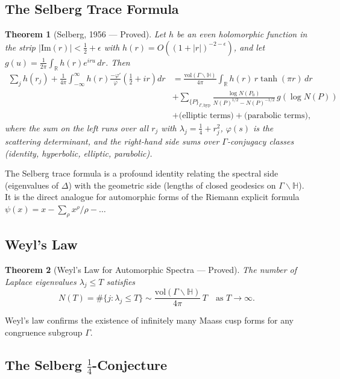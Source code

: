 \documentclass[12pt,a4paper]{amsart}
\newtheorem{theorem}{Theorem}[section]
\theoremstyle{definition}
\newcommand{\HH}{\mathbb{H}}
\newcommand{\RR}{\mathbb{R}}
\newcommand{\im}{\mathrm{Im}}
\newcommand{\vol}{\mathrm{vol}}
\begin{document}
\subsection{The Selberg Trace Formula}

\begin{theorem}[Selberg, 1956 — Proved]
\label{thm:selberg_trace}
Let $h$ be an even holomorphic function in the strip $|\im(r)| < \frac{1}{2}+\epsilon$
with $h(r) = O((1+|r|)^{-2-\epsilon})$, and let $g(u) = \frac{1}{2\pi} \int_\RR h(r) e^{iru}\, dr$.
Then
\begin{align*}
\sum_j h(r_j) + \frac{1}{4\pi}\int_{-\infty}^\infty h(r) \frac{-\varphi'}{\varphi}\!\left(\tfrac{1}{2}+ir\right) dr
&= \frac{\vol(\Gamma \backslash \HH)}{4\pi}\int_\RR h(r)\, r \tanh(\pi r)\, dr \\
&+ \sum_{\{P\}_{\Gamma,\text{hyp}}} \frac{\log N(P_0)}{N(P)^{1/2} - N(P)^{-1/2}}\, g(\log N(P)) \\
&+ \text{(elliptic terms)} + \text{(parabolic terms)},
\end{align*}
where the sum on the left runs over all $r_j$ with $\lambda_j = \frac{1}{4}+r_j^2$,
$\varphi(s)$ is the scattering determinant, and the right-hand side sums over
$\Gamma$-conjugacy classes (identity, hyperbolic, elliptic, parabolic).
\end{theorem}

The Selberg trace formula is a profound identity relating the spectral side
(eigenvalues of $\Delta$) with the geometric side (lengths of closed geodesics on
$\Gamma \backslash \HH$). It is the direct analogue for automorphic forms of the
Riemann explicit formula $\psi(x) = x - \sum_\rho x^\rho/\rho - \ldots$

\subsection{Weyl's Law}

\begin{theorem}[Weyl's Law for Automorphic Spectra — Proved]
\label{thm:weyl}
The number of Laplace eigenvalues $\lambda_j \leq T$ satisfies
\[
N(T) = \#\{j : \lambda_j \leq T\} \sim \frac{\vol(\Gamma \backslash \HH)}{4\pi}\, T
\quad \text{as } T \to \infty.
\]
\end{theorem}

Weyl's law confirms the existence of infinitely many Maass cusp forms for any
congruence subgroup $\Gamma$.

\subsection{The Selberg \texorpdfstring{$\frac{1}{4}$}{1/4}-Conjecture}
\end{document}
